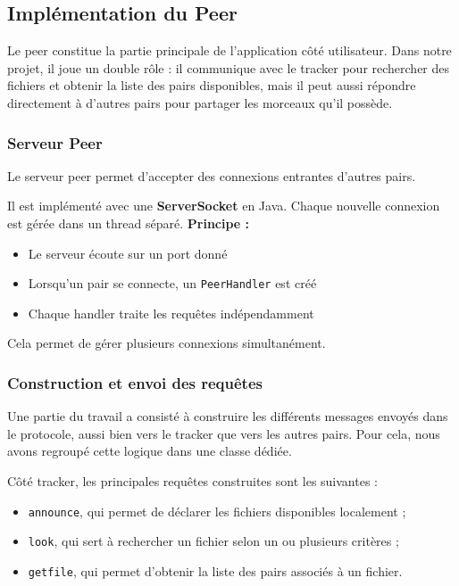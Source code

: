\subsection{Implémentation du Peer}
Le peer constitue la partie principale de l’application côté utilisateur. Dans notre projet, il joue un double rôle : il communique avec le tracker pour rechercher des fichiers et obtenir la liste des pairs disponibles, mais il peut aussi répondre directement à d’autres pairs pour partager les morceaux qu’il possède.


\subsubsection{Serveur Peer}
Le serveur peer permet d’accepter des connexions entrantes d’autres pairs.

Il est implémenté avec une \textbf{ServerSocket} en Java. 
Chaque nouvelle connexion est gérée dans un thread séparé.
\textbf{Principe :}
\begin{itemize}
    \item Le serveur écoute sur un port donné
    \item Lorsqu’un pair se connecte, un \texttt{PeerHandler} est créé
    \item Chaque handler traite les requêtes indépendamment
\end{itemize}

Cela permet de gérer plusieurs connexions simultanément.



\subsubsection{Construction et envoi des requêtes}
Une partie du travail a consisté à construire les différents messages envoyés dans le protocole, aussi bien vers le tracker que vers les autres pairs. Pour cela, nous avons regroupé cette logique dans une classe dédiée.

Côté tracker, les principales requêtes construites sont les suivantes :
\begin{itemize}
    \item \texttt{announce}, qui permet de déclarer les fichiers disponibles localement ;
    \item \texttt{look}, qui sert à rechercher un fichier selon un ou plusieurs critères ;
    \item \texttt{getfile}, qui permet d’obtenir la liste des pairs associés à un fichier.
\end{itemize}

